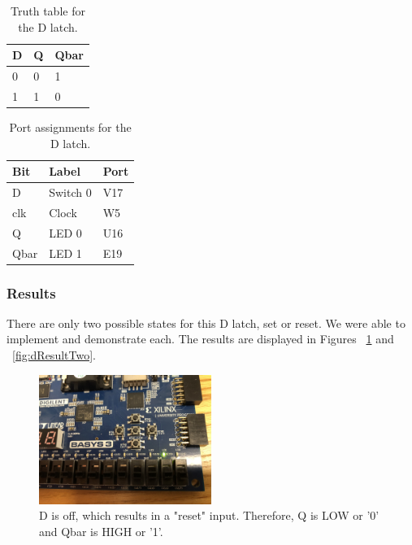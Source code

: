 \documentclass[11pt]{article}
\begin{document}
\begin{table}[H]
\begin{center}
\begin{tabular}{| l | l | l |}
	\hline
	D & Q & Qbar \\ \hline
	0 & 0 & 1 \\ \hline
	1 & 1 & 0 \\ \hline
\end{tabular}
\caption{\label{tab:dTruthTable}Truth table for the D latch.}
\end{center}
\end{table}

\begin{table}[H]
\begin{center}
\begin{tabular}{| l | l | l |}
	\hline
	Bit & Label & Port \\ \hline
	D & Switch 0 & V17 \\ \hline
	clk & Clock & W5 \\ \hline
	Q & LED 0 & U16 \\ \hline
	Qbar & LED 1 & E19 \\ \hline
\end{tabular}
\caption{\label{tab:dPorts}Port assignments for the D latch.}
\end{center}
\end{table}

\subsubsection{Results}
There are only two possible states for this D latch, set or reset. We were able to implement and demonstrate each. The results are displayed in Figures ~\ref{fig:dResultOne} and ~\ref{fig:dResultTwo}.

\begin{figure}[H]
\begin{center}
	\includegraphics[width=0.5\textwidth]{./images/img_201.jpg}
	\caption{\label{fig:dResultOne}D is off, which results in a "reset" input. Therefore, Q is LOW or '0' and Qbar is HIGH or '1'.}
\end{center}
\end{figure}
\end{document}

